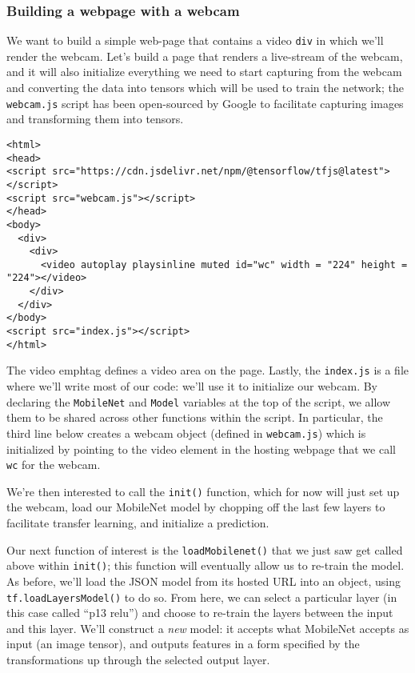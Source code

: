 \documentclass[12pt]{article}
\begin{document}
\subsubsection{Building a webpage with a webcam}
We want to build a simple web-page that contains a video \texttt{div} in which we'll render the webcam. Let's build a page that renders a live-stream of the webcam, and it will also initialize everything we need to start capturing from the webcam and converting the data into tensors which will be used to train the network; the \texttt{webcam.js} script has been open-sourced by Google to facilitate capturing images and transforming them into tensors.
\begin{verbatim}
<html>
<head>
<script src="https://cdn.jsdelivr.net/npm/@tensorflow/tfjs@latest"> </script>
<script src="webcam.js"></script>
</head>
<body>
  <div>
    <div>
      <video autoplay playsinline muted id="wc" width = "224" height = "224"></video>
    </div>
  </div>
</body>
<script src="index.js"></script>
</html>
\end{verbatim}
The video emph{tag} defines a video area on the page. Lastly, the \texttt{index.js} is a file where we'll write most of our code: we'll use it to initialize our webcam. By declaring the \texttt{MobileNet} and \texttt{Model} variables at the top of the script, we allow them to be shared across other functions within the script. In particular, the third line below creates a webcam object (defined in \texttt{webcam.js}) which is initialized by pointing to the video element in the hosting webpage that we call \texttt{wc} for the webcam.

We're then interested to call the \texttt{init()} function, which for now will just set up the webcam, load our MobileNet model by chopping off the last few layers to facilitate transfer learning, and initialize a prediction.


Our next function of interest is the \texttt{loadMobilenet()} that we just saw get called above within \texttt{init()}; this function will eventually allow us to re-train the model. As before, we'll load the JSON model from its hosted URL into an object, using \texttt{tf.loadLayersModel()} to do so. From here, we can select a particular layer (in this case called ``p13 relu'') and choose to re-train the layers between the input and this layer. We'll construct a \emph{new} model: it accepts what MobileNet accepts as input (an image tensor), and outputs features in a form specified by the transformations up through the selected output layer.  

\end{document}
